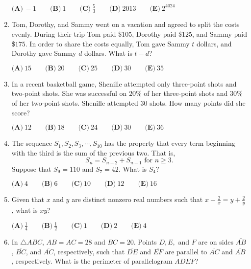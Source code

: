 \documentclass{article}
\begin{document}
\begin{enumerate}[label=\arabic*., itemsep=0.5em]
\( \textbf{(A)}\ -1\qquad\textbf{(B)}\ 1\qquad\textbf{(C)}\ \frac{5}{3}\qquad\textbf{(D)}\ 2013\qquad\textbf{(E)}\ 2^{4024} \)\par \vspace{0.5em}\item Tom, Dorothy, and Sammy went on a vacation and agreed to split the costs evenly. During their trip Tom paid \$\(105\), Dorothy paid \$\(125\), and Sammy paid \$\(175\). In order to share the costs equally, Tom gave Sammy \(t\) dollars, and Dorothy gave Sammy \(d\) dollars. What is \(t-d\)?

\( \textbf{(A)}\ 15\qquad\textbf{(B)}\ 20\qquad\textbf{(C)}\ 25\qquad\textbf{(D)}\ 30\qquad\textbf{(E)}\ 35 \)\par \vspace{0.5em}\item In a recent basketball game, Shenille attempted only three-point shots and two-point shots. She was successful on \(20\%\) of her three-point shots and \(30\%\) of her two-point shots. Shenille attempted \(30\) shots. How many points did she score?

\( \textbf{(A)}\ 12\qquad\textbf{(B)}\ 18\qquad\textbf{(C)}\ 24\qquad\textbf{(D)}\ 30\qquad\textbf{(E)}\ 36 \)\par \vspace{0.5em}\item The sequence \(S_1, S_2, S_3, \cdots, S_{10}\) has the property that every term beginning with the third is the sum of the previous two.  That is, 
\begin{equation*}
S_n = S_{n-2} + S_{n-1} \text{ for } n \ge 3.
\end{equation*}
 Suppose that \(S_9 = 110\) and \(S_7 = 42\).  What is \(S_4\)?

\( \textbf{(A)}\ 4\qquad\textbf{(B)}\ 6\qquad\textbf{(C)}\ 10\qquad\textbf{(D)}\ 12\qquad\textbf{(E)}\ 16\qquad \)\par \vspace{0.5em}\item Given that \(x\) and \(y\) are distinct nonzero real numbers such that \(x+\tfrac{2}{x} = y + \tfrac{2}{y}\), what is \(xy\)?

\( \textbf{(A)}\ \frac{1}{4}\qquad\textbf{(B)}\ \frac{1}{2}\qquad\textbf{(C)}\ 1\qquad\textbf{(D)}\ 2\qquad\textbf{(E)}\ 4\qquad \)\par \vspace{0.5em}\item In \(\triangle ABC\), \(AB=AC=28\) and \(BC=20\).  Points \(D,E,\) and \(F\) are on sides \(\overline{AB}\), \(\overline{BC}\), and \(\overline{AC}\), respectively, such that \(\overline{DE}\) and \(\overline{EF}\) are parallel to \(\overline{AC}\) and \(\overline{AB}\), respectively.  What is the perimeter of parallelogram \(ADEF\)?



\end{enumerate}
\end{document}
